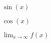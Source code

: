 \documentclass{article}
\begin{document}
    $ \sin(x) $

    $ \cos(x) $

    $ \lim_{x\to\infty} f(x) $
\end{document}

